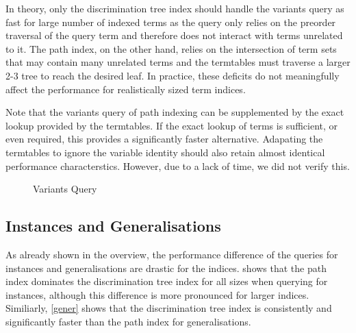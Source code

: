 In theory, only the discrimination tree index should handle the variants query as fast for large number of indexed terms as the query only relies on the preorder traversal of the query term and therefore does not interact with terms unrelated to it.
The path index, on the other hand, relies on the intersection of term sets that may contain many unrelated terms and the termtables must traverse a larger 2-3 tree to reach the desired leaf. In practice, these deficits do not meaningfully affect the performance for realistically sized term indices.

Note that the variants query of path indexing can be supplemented by the exact lookup provided by the termtables. If the exact lookup of terms is sufficient, or even required, this provides a significantly faster alternative. Adapating the termtables to ignore the variable identity should also retain almost identical performance characterstics. However, due to a lack of time, we did not verify this.

\begin{figure}[h]
  \centering
{}
\caption{Variants Query}
\label{variants}
\end{figure}

\subsection{Instances and Generalisations}
As already shown in the overview, the performance difference of the queries for instances and generalisations are drastic for the indices.  shows that the path index dominates the discrimination tree index for all sizes when querying for instances, although this difference is more pronounced for larger indices. Similiarly, \cref{gener} shows that the discrimination tree index is consistently and significantly faster than the path index for generalisations.

